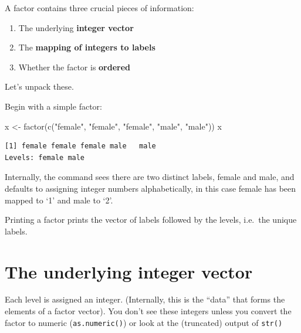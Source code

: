 \documentclass[
]{book}
\makeatletter
\newenvironment{Shaded}{\begin{snugshade}}{\end{snugshade}}
\newcommand{\FunctionTok}[1]{\textcolor[rgb]{0.00,0.00,0.00}{#1}}
\newcommand{\NormalTok}[1]{#1}
\newcommand{\OtherTok}[1]{\textcolor[rgb]{0.56,0.35,0.01}{#1}}
\newcommand{\StringTok}[1]{\textcolor[rgb]{0.31,0.60,0.02}{#1}}
\newenvironment{kframe}{%
\medskip{}
\setlength{\fboxsep}{.8em}
 \def\at@end@of@kframe{}%
 \ifinner\ifhmode%
  \def\at@end@of@kframe{\end{minipage}}%
  \begin{minipage}{\columnwidth}%
 \fi\fi%
 \def\FrameCommand##1{\hskip\@totalleftmargin \hskip-\fboxsep
 \colorbox{shadecolor}{##1}\hskip-\fboxsep
     \hskip-\linewidth \hskip-\@totalleftmargin \hskip\columnwidth}%
 \MakeFramed {\advance\hsize-\width
   \@totalleftmargin\z@ \linewidth\hsize
   \@setminipage}}%
 {\par\unskip\endMakeFramed%
 \at@end@of@kframe}
\newenvironment{rmdblock}[1]
  {
  \begin{itemize}
  \renewcommand{\labelitemi}{
    \raisebox{-.7\height}[0pt][0pt]{
      {\setkeys{Gin}{width=3em,keepaspectratio}\texttt{[image: images/\#1]}}
    }
  }
  \setlength{\fboxsep}{1em}
  \begin{kframe}
  \item
  }
  {
  \end{kframe}
  \end{itemize}
  }
\newenvironment{note}
  {\begin{rmdblock}{note}}
  {\end{rmdblock}}
\makeatother
\begin{document}
\begin{note}
A factor contains three crucial pieces of information:

\begin{enumerate}
\def\labelenumi{\arabic{enumi}.}
\item
  The underlying \textbf{integer vector}
\item
  The \textbf{mapping of integers to labels}
\item
  Whether the factor is \textbf{ordered}
\end{enumerate}
\end{note}

Let's unpack these.

Begin with a simple factor:

\begin{Shaded}
\begin{Highlighting}[]
\NormalTok{x }\OtherTok{\textless{}{-}} \FunctionTok{factor}\NormalTok{(}\FunctionTok{c}\NormalTok{(}\StringTok{"female"}\NormalTok{, }\StringTok{"female"}\NormalTok{, }\StringTok{"female"}\NormalTok{, }\StringTok{"male"}\NormalTok{, }\StringTok{"male"}\NormalTok{))}
\NormalTok{x}
\end{Highlighting}
\end{Shaded}

\begin{verbatim}
[1] female female female male   male  
Levels: female male
\end{verbatim}

Internally, the command sees there are two distinct labels, female and male, and defaults to assigning integer numbers alphabetically, in this case female has been mapped to `1' and male to `2'.

Printing a factor prints the vector of labels followed by the levels, i.e.~the unique labels.

\hypertarget{the-underlying-integer-vector}{%
\section{\texorpdfstring{The underlying \textbf{integer vector}}{The underlying integer vector}}\label{the-underlying-integer-vector}}

Each level is assigned an integer. (Internally, this is the ``data'' that forms the elements of a factor vector). You don't see these integers unless you convert the factor to numeric (\texttt{as.numeric()}) or look at the (truncated) output of \texttt{str()}
\end{document}
